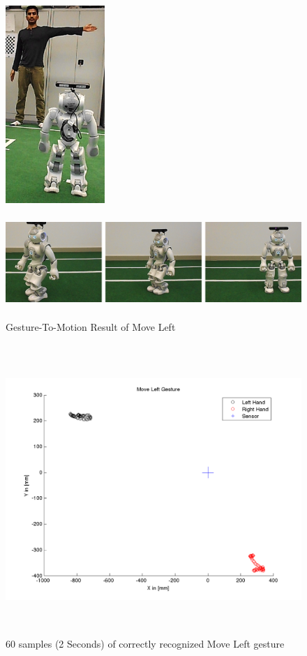 \begin{figure}
	[h] 
	\begin{minipage}
		{1 
		\textwidth} \centering 
		\includegraphics[height=75mm]{figures/result/usr-move-left.png} \caption*{} 
	\end{minipage}
	\begin{minipage}
		{1 
		\textwidth} 
		\includegraphics[height=42mm]{figures/result/nao-gm-move-left.png} 
	\end{minipage}
	\caption{Gesture-To-Motion Result of Move Left} \label{res:gm:move:left} 
\end{figure}
\begin{figure}
	[h] \centering 
	\includegraphics[height=110mm]{figures/result/test-move-left.png} \caption{60 samples (2 Seconds) of correctly recognized Move Left gesture}
	\label{res:pl:move:left}	 
\end{figure}
